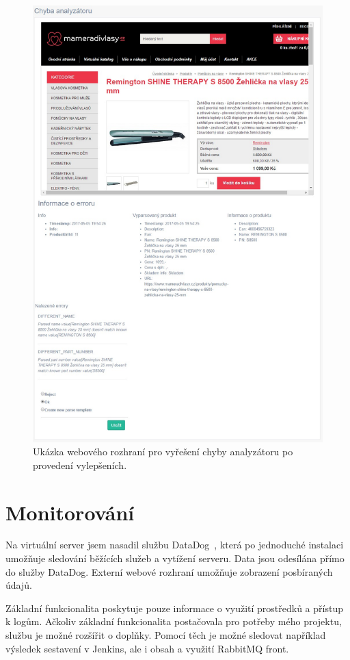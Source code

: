 \documentclass[thesis=B,czech]{FITthesis}[2012/06/26]
\begin{document}
\begin{figure}\centering
 	\includegraphics[width=1.0\textwidth]{resources/analyser-err}
	\caption[Webové rozhraní pro vyřešení chyby analyzátoru po provedení vylepšeních]{Ukázka webového rozhraní pro vyřešení chyby analyzátoru po provedení vylepšeních.}\label{fig:analyser-error}
\end{figure}

\section{Monitorování}
Na virtuální server jsem nasadil službu DataDog~\cite{dataDog}, která po jednoduché instalaci umožňuje sledování běžících služeb
a vytížení serveru. Data jsou odesílána přímo do služby DataDog. Externí webové rozhraní umožňuje zobrazení posbíraných údajů.
\par
Základní funkcionalita poskytuje pouze informace o využití prostředků a přístup k logům. Ačkoliv základní funkcionalita postačovala pro potřeby 
mého projektu, službu je možné rozšířit o doplňky. Pomocí těch je možné sledovat například výsledek sestavení v Jenkins, ale i obsah a využití RabbitMQ front. 
\end{document}
